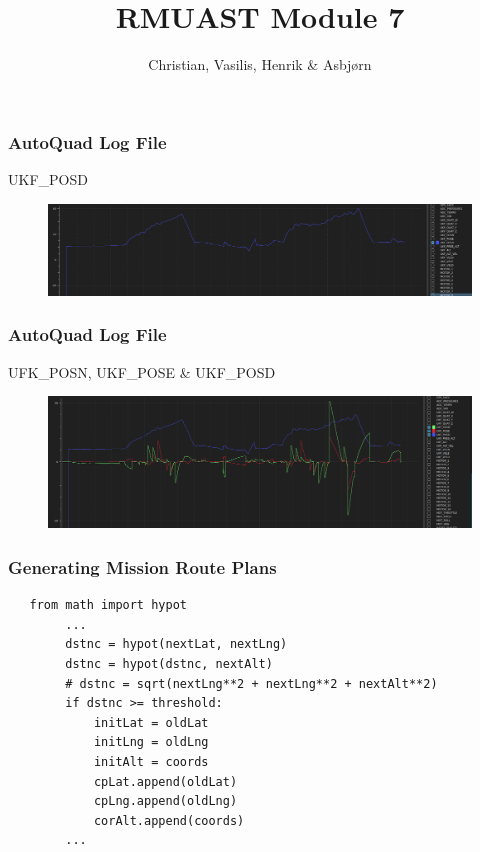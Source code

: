 \documentclass[10pt, compress]{beamer}
\title{RMUAST Module 7}
\subtitle{}
\author{Christian, Vasilis, Henrik \& Asbjørn}
\institute{Group 5}
\begin{document}
\maketitle

\begin{frame}[fragile]
\frametitle{AutoQuad Log File}
UKF\_POSD
\begin{figure}
  \centering
 \includegraphics[width=1.1\textwidth]{Figures/2}
\end{figure}

\end{frame}

\begin{frame}[fragile]
  \frametitle{AutoQuad Log File}
  UFK\_POSN, UKF\_POSE \& UKF\_POSD
\begin{figure}
  \centering
 \includegraphics[width=1.1\textwidth]{Figures/1}
\end{figure}
\end{frame}


\begin{frame}[fragile]
	\frametitle{Generating Mission Route Plans}
\begin{verbatim}
   from math import hypot
        ...
        dstnc = hypot(nextLat, nextLng)
        dstnc = hypot(dstnc, nextAlt)
        # dstnc = sqrt(nextLng**2 + nextLng**2 + nextAlt**2)
        if dstnc >= threshold:
            initLat = oldLat
            initLng = oldLng
            initAlt = coords
            cpLat.append(oldLat)
            cpLng.append(oldLng)
            corAlt.append(coords)
        ...
\end{verbatim}
\end{frame}
\end{document}

